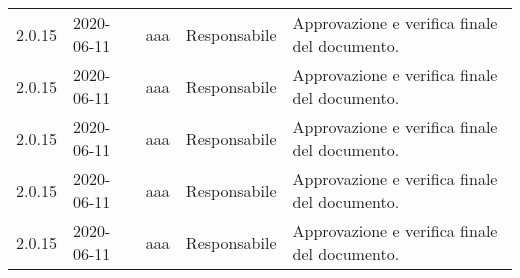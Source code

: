 {\begin{longtable}{c C{3.5cm} c C{3.5cm} C{3.5cm}}
2.0.15 & 2020-06-11 & aaa & Responsabile & Approvazione e verifica finale del documento. \\
2.0.15 & 2020-06-11 & aaa & Responsabile & Approvazione e verifica finale del documento. \\
2.0.15 & 2020-06-11 & aaa & Responsabile & Approvazione e verifica finale del documento. \\
2.0.15 & 2020-06-11 & aaa & Responsabile & Approvazione e verifica finale del documento. \\
2.0.15 & 2020-06-11 & aaa & Responsabile & Approvazione e verifica finale del documento.\\
		
\end{longtable}
}